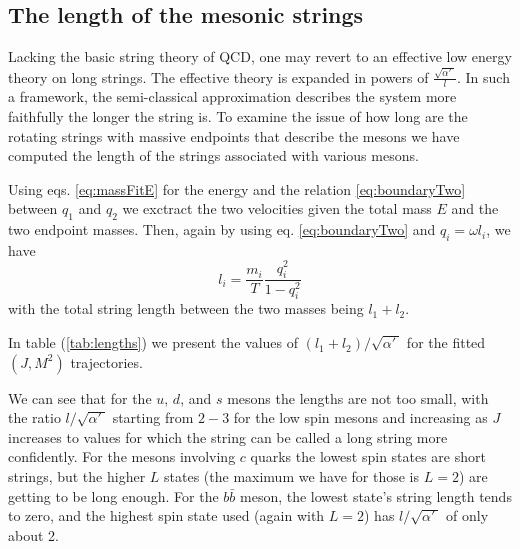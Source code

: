 \documentclass[11pt,a4]{article}
\def\be{\begin{equation}}
\def\ee{\end{equation}}
\newcommand{\alp}{\ensuremath{\alpha'\:}}
\newcommand{\bbb}{b\bar{b}}
\begin{document}
\subsection{The length of the mesonic strings}
Lacking the basic string theory of QCD, one may revert to an effective low energy  theory on long strings\cite{Aharony:2013ipa}. The effective theory is expanded in powers of $\frac{\sqrt{\alp}}{l}$. In such a framework, the  semi-classical approximation describes the system more faithfully the longer the string is. To examine the issue of how long are the rotating strings with massive endpoints that describe the mesons we have computed the length of the strings associated with various mesons.

Using eqs. \eqref{eq:massFitE} for the energy and the relation \eqref{eq:boundaryTwo} between \(q_1\) and \(q_2\) we exctract the two velocities given the total mass \(E\) and the two endpoint masses. Then, again by using eq. \eqref{eq:boundaryTwo} and \(q_i = \omega l_i\), we have
	\be l_i = \frac{m_i}{T}\frac{q_i^2}{1-q_i^2} \ee
	with the total string length between the two masses being \(l_1 + l_2\).
	
	In table (\ref{tab:lengths}) we present the values of \((l_1+l_2)/\sqrt{\alp}\) for the fitted \((J,M^2)\) trajectories.
	
	We can see that for the \(u\), \(d\), and \(s\) mesons the lengths are not too small, with the ratio \(l/\sqrt{\alp}\) starting from \(2-3\) for the low spin mesons and increasing as \(J\) increases to values for which the string can be called a long string more confidently. For the mesons involving \(c\) quarks the lowest spin states are short strings, but the higher \(L\) states (the maximum we have for those is \(L = 2\)) are getting to be long enough. For the \(\bbb\) meson, the lowest state's string length tends to zero, and the highest spin state used (again with \(L = 2\)) has \(l/\sqrt{\alp}\) of only about 2.
\end{document}
